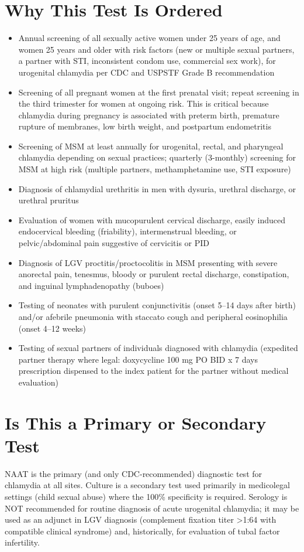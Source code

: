 \section*{Why This Test Is Ordered}
\begin{itemize}
  \item Annual screening of all sexually active women under 25 years of age, and women 25 years and older with risk factors (new or multiple sexual partners, a partner with STI, inconsistent condom use, commercial sex work), for urogenital chlamydia per CDC and USPSTF Grade B recommendation
  \item Screening of all pregnant women at the first prenatal visit; repeat screening in the third trimester for women at ongoing risk. This is critical because chlamydia during pregnancy is associated with preterm birth, premature rupture of membranes, low birth weight, and postpartum endometritis
  \item Screening of MSM at least annually for urogenital, rectal, and pharyngeal chlamydia depending on sexual practices; quarterly (3-monthly) screening for MSM at high risk (multiple partners, methamphetamine use, STI exposure)
  \item Diagnosis of chlamydial urethritis in men with dysuria, urethral discharge, or urethral pruritus
  \item Evaluation of women with mucopurulent cervical discharge, easily induced endocervical bleeding (friability), intermenstrual bleeding, or pelvic/abdominal pain suggestive of cervicitis or PID
  \item Diagnosis of LGV proctitis/proctocolitis in MSM presenting with severe anorectal pain, tenesmus, bloody or purulent rectal discharge, constipation, and inguinal lymphadenopathy (buboes)
  \item Testing of neonates with purulent conjunctivitis (onset 5--14 days after birth) and/or afebrile pneumonia with staccato cough and peripheral eosinophilia (onset 4--12 weeks)
  \item Testing of sexual partners of individuals diagnosed with chlamydia (expedited partner therapy where legal: doxycycline 100 mg PO BID x 7 days prescription dispensed to the index patient for the partner without medical evaluation)
\end{itemize}

\section*{Is This a Primary or Secondary Test}
NAAT is the primary (and only CDC-recommended) diagnostic test for chlamydia at all sites. Culture is a secondary test used primarily in medicolegal settings (child sexual abuse) where the 100\% specificity is required. Serology is NOT recommended for routine diagnosis of acute urogenital chlamydia; it may be used as an adjunct in LGV diagnosis (complement fixation titer >1:64 with compatible clinical syndrome) and, historically, for evaluation of tubal factor infertility.

